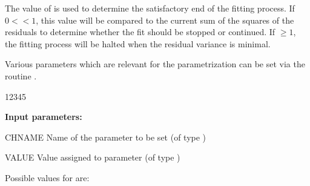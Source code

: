 The value of  is used to determine the satisfactory
end of the fitting process.
If $0<$$<1$, this value will be compared to the
current sum of the squares of the residuals to determine whether the
fit should be stopped or continued.
If $\geq1$, the fitting process will be
halted when the residual variance is minimal.
 
Various parameters which are relevant for the parametrization
can be set via the routine .
 
 
\begin{DLtt}{12345}
\item[{\rm\bf Input parameters:}]
\item[CHNAME] Name of the parameter to be set (of type )
\item[VALUE] Value assigned to parameter  (of type )
\end{DLtt}
 
Possible values for  are:
 
